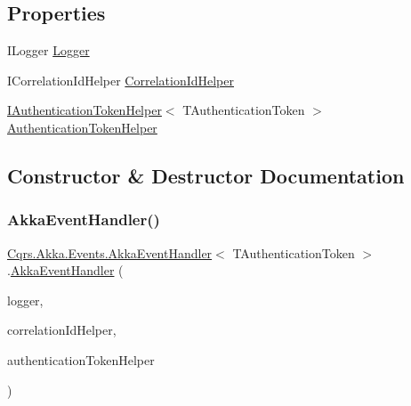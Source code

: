\subsection*{Properties}
\begin{DoxyCompactItemize}
\item 
I\+Logger \hyperlink{classCqrs_1_1Akka_1_1Events_1_1AkkaEventHandler_af9ccf9b06321f7cbb21934e83005346e_af9ccf9b06321f7cbb21934e83005346e}{Logger}
\item 
I\+Correlation\+Id\+Helper \hyperlink{classCqrs_1_1Akka_1_1Events_1_1AkkaEventHandler_a711ada6cc5e9fea454983378f6d5f109_a711ada6cc5e9fea454983378f6d5f109}{Correlation\+Id\+Helper}
\item 
\hyperlink{interfaceCqrs_1_1Authentication_1_1IAuthenticationTokenHelper}{I\+Authentication\+Token\+Helper}$<$ T\+Authentication\+Token $>$ \hyperlink{classCqrs_1_1Akka_1_1Events_1_1AkkaEventHandler_a6ab1be5352fea3cad8f8599ab31c0ab6_a6ab1be5352fea3cad8f8599ab31c0ab6}{Authentication\+Token\+Helper}
\end{DoxyCompactItemize}


\subsection{Constructor \& Destructor Documentation}
\mbox{\label{classCqrs_1_1Akka_1_1Events_1_1AkkaEventHandler_aee50c0ed50e291f311721ca6a103c41f_aee50c0ed50e291f311721ca6a103c41f}} 
\subsubsection{\texorpdfstring{Akka\+Event\+Handler()}{AkkaEventHandler()}}
{\footnotesize\ttfamily \hyperlink{classCqrs_1_1Akka_1_1Events_1_1AkkaEventHandler}{Cqrs.\+Akka.\+Events.\+Akka\+Event\+Handler}$<$ T\+Authentication\+Token $>$.\hyperlink{classCqrs_1_1Akka_1_1Events_1_1AkkaEventHandler}{Akka\+Event\+Handler} (\begin{DoxyParamCaption}\item[{I\+Logger}]{logger,  }\item[{I\+Correlation\+Id\+Helper}]{correlation\+Id\+Helper,  }\item[{\hyperlink{interfaceCqrs_1_1Authentication_1_1IAuthenticationTokenHelper}{I\+Authentication\+Token\+Helper}$<$ T\+Authentication\+Token $>$}]{authentication\+Token\+Helper }\end{DoxyParamCaption})\hspace{0.3cm}{\ttfamily [protected]}}



